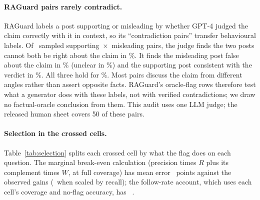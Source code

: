 \paragraph{RAGuard pairs rarely contradict.} RAGuard labels a post supporting or misleading by whether GPT-4 judged the claim correctly
with it in context, so its ``contradiction pairs'' transfer behavioural labels. Of \rgAudN\ sampled
supporting~$\times$~misleading pairs, the judge finds the two posts cannot both be right about the claim in
\rgAudContradict\%. It finds the misleading post false about the claim in \rgAudBFalse\% (unclear in
\rgAudBUnclear\%) and the supporting post consistent with the verdict in \rgAudASupports\%. All three hold for
\rgAudVerified\%. Most pairs discuss the claim from different angles rather than assert opposite
facts. RAGuard's oracle-flag rows therefore test what a generator does with these labels, not with verified
contradictions; we draw no factual-oracle conclusion from them. This audit uses one LLM judge; the released
human sheet covers 50 of these pairs.


\paragraph{Selection in the crossed cells.} Table~\ref{tab:selection} splits each crossed cell by what the flag does
on each question. The marginal break-even calculation (precision times $R$ plus its complement times $W$, at full
coverage) has mean error \selMargMae\ points against the observed gains (\selMargCovMae\ when scaled by recall); the
follow-rate account, which uses each cell's coverage and no-flag accuracy, has \predEightMae\ \predEightMaeCI.
